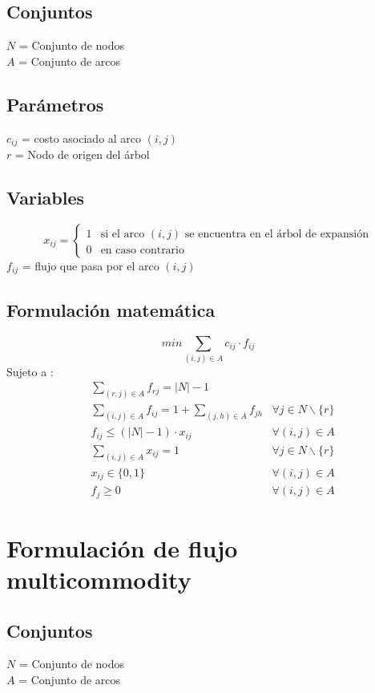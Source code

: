 \documentclass{article}
\numberwithin{equation}{section}
\begin{document}
\subsection{Conjuntos}
$N$ = Conjunto de nodos\\
$A$ = Conjunto de arcos
\subsection{Parámetros}
$c_{ij}$ = costo asociado al arco $(i,j)$\\
$r$ = Nodo de origen del árbol
\subsection{Variables}
\begin{center}
\[x_{ij}={\begin{cases}1&{\mbox{si el arco $(i,j)$ se encuentra en el árbol de expansión}}\\0&{\mbox{en caso contrario}}\end{cases}}
\]
$f_{ij}$ = flujo que pasa por el arco $(i,j)$
\end{center}
\subsection{Formulación matemática}
\begin{equation}
min \sum_{(i,j) \in A} c_{ij} \cdot f_{ij}
\end{equation}
Sujeto a : \begin{align}
& \sum_{(r,j) \in A} f_{rj} = |N| - 1\\
& \sum_{(i,j) \in A} f_{ij} = 1 + \sum_{(j,h) \in A} f_{jh} &\forall j \in N \backslash \{r\} \\
& f_{ij} \leq (|N| - 1)\cdot x_{ij} &\forall (i,j) \in A\\
& \sum_{(i,j) \in A} x_{ij} = 1 &\forall j \in N \backslash \{r\}\\
& x_{ij} \in \{0,1\} &\forall (i,j) \in A\\
& f_{j} \geq 0 &\forall (i,j) \in A
\end{align}

\newpage
\section{Formulación de flujo multicommodity}
\subsection{Conjuntos}
$N$ = Conjunto de nodos\\
$A$ = Conjunto de arcos
\end{document}
